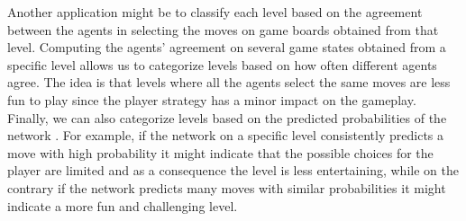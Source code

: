 Another application might be to classify each level based on the agreement between the agents in selecting the moves on game boards obtained from that level.
Computing the agents' agreement on several game states obtained from a specific level allows us to categorize levels based on how often different agents agree. The idea is that levels where all the agents select the same moves are less fun to play since the player strategy has a minor impact on the gameplay.
Finally, we can also categorize levels based on the predicted probabilities of the network \cite{costa_probabilistic_1996}. For example, if the network on a specific level consistently predicts a move with high probability it might indicate that the possible choices for the player are limited and as a consequence the level is less entertaining, while on the contrary if the network predicts many moves with similar probabilities it might indicate a more fun and challenging level.





